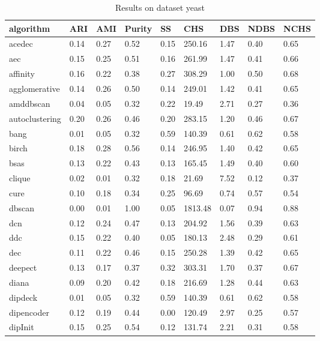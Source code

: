 \begin{table}[H]
\centering
\caption{Results on dataset yeast}
\label{tab:params:yeast}
\begin{tabular}{|l|l|l|l|l|l|l|l|l|}
\hline
algorithm & ARI & AMI & Purity & SS & CHS & DBS & NDBS & NCHS \\
\hline
acedec & 0.14 & 0.27 & 0.52 & 0.15 & 250.16 & 1.47 & 0.40 & 0.65 \\
\hline
aec & 0.15 & 0.25 & 0.51 & 0.16 & 261.99 & 1.47 & 0.41 & 0.66 \\
\hline
affinity & 0.16 & 0.22 & 0.38 & 0.27 & 308.29 & 1.00 & 0.50 & 0.68 \\
\hline
agglomerative & 0.14 & 0.26 & 0.50 & 0.14 & 249.01 & 1.42 & 0.41 & 0.65 \\
\hline
amddbscan & 0.04 & 0.05 & 0.32 & 0.22 & 19.49 & 2.71 & 0.27 & 0.36 \\
\hline
autoclustering & 0.20 & 0.26 & 0.46 & 0.20 & 283.15 & 1.20 & 0.46 & 0.67 \\
\hline
bang & 0.01 & 0.05 & 0.32 & 0.59 & 140.39 & 0.61 & 0.62 & 0.58 \\
\hline
birch & 0.18 & 0.28 & 0.56 & 0.14 & 246.95 & 1.40 & 0.42 & 0.65 \\
\hline
bsas & 0.13 & 0.22 & 0.43 & 0.13 & 165.45 & 1.49 & 0.40 & 0.60 \\
\hline
clique & 0.02 & 0.01 & 0.32 & 0.18 & 21.69 & 7.52 & 0.12 & 0.37 \\
\hline
cure & 0.10 & 0.18 & 0.34 & 0.25 & 96.69 & 0.74 & 0.57 & 0.54 \\
\hline
dbscan & 0.00 & 0.01 & 1.00 & 0.05 & 1813.48 & 0.07 & 0.94 & 0.88 \\
\hline
dcn & 0.12 & 0.24 & 0.47 & 0.13 & 204.92 & 1.56 & 0.39 & 0.63 \\
\hline
ddc & 0.15 & 0.22 & 0.40 & 0.05 & 180.13 & 2.48 & 0.29 & 0.61 \\
\hline
dec & 0.11 & 0.22 & 0.46 & 0.15 & 250.28 & 1.39 & 0.42 & 0.65 \\
\hline
deepect & 0.13 & 0.17 & 0.37 & 0.32 & 303.31 & 1.70 & 0.37 & 0.67 \\
\hline
diana & 0.09 & 0.20 & 0.42 & 0.18 & 216.69 & 1.28 & 0.44 & 0.63 \\
\hline
dipdeck & 0.01 & 0.05 & 0.32 & 0.59 & 140.39 & 0.61 & 0.62 & 0.58 \\
\hline
dipencoder & 0.12 & 0.19 & 0.44 & 0.00 & 120.49 & 2.97 & 0.25 & 0.57 \\
\hline
dipInit & 0.15 & 0.25 & 0.54 & 0.12 & 131.74 & 2.21 & 0.31 & 0.58 \\

\end{tabular}
\end{table}
